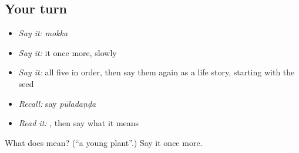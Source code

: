 \subsection*{Your turn}
\begin{itemize}
\raggedright
  \item \emph{Say it:} \emph{mokka}
  \item \emph{Say it:} it once more, slowly
  \item \emph{Say it:} all five in order, then say them again as a life story, starting with the seed
  \item \emph{Recall:} say \emph{pūladaṇḍa}
  \item \emph{Read it:} \textbf{}, then say what it means
\end{itemize}

\begin{tcolorbox}[breakable,colback=teal!4,colframe=teal!35!black,title={Before you move on}]
What does  mean? (\textquotedblleft{}a young plant\textquotedblright{}.) Say it once more.
\end{tcolorbox}
